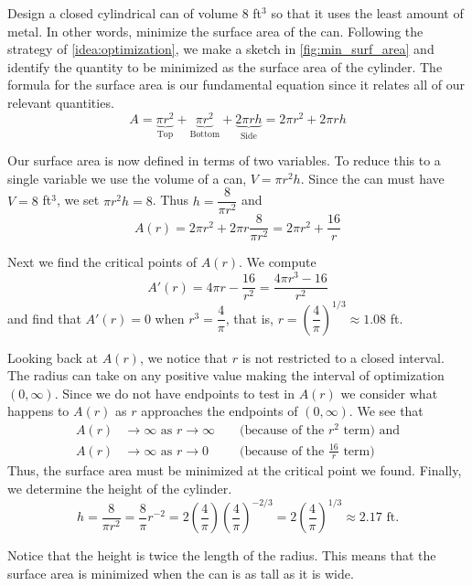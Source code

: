 \begin{example}\label{ex_min_surf_area}
Design a closed cylindrical can of volume $8$ ft$^3$ so that it uses the least amount of metal. In other words, minimize the surface area of the can.
Following the strategy of \autoref{idea:optimization}, we make a sketch in \autoref{fig:min_surf_area} and identify the quantity to be minimized as the surface area of the cylinder. The formula for the surface area is our fundamental equation  since it relates all of our relevant quantities.
\[
 A
 =\underbrace{\pi r^2}_{\text{Top}}
 +\underbrace{\pi r^2}_{\text{Bottom}}
 +\underbrace{2\pi rh}_{\text{Side}}
 =2\pi r^2+2\pi rh
\]

Our surface area is now defined in terms of two variables. To reduce this to a single variable we use the volume of a can, $V=\pi r^2h$. Since the can must have $V=8$ ft$^3$, we set $\pi r^2h=8$. Thus $h=\dfrac8{\pi r^2}$ and
\[A(r)=2\pi r^2+2\pi r\frac8{\pi r^2}=2\pi r^2+\frac{16}{r}\]

Next we find the critical points of $A(r)$. We compute
\[A'(r)=4\pi r-\dfrac{16}{r^2}=\dfrac{4\pi r^3-16}{r^2}\]
and find that $A'(r)=0$ when $r^3=\dfrac4\pi$, that is, $r=\left(\dfrac4\pi\right)^{1/3}\approx 1.08$ ft.

Looking back at $A(r)$, we notice that $r$ is not restricted to a closed interval. The radius can take on any positive value making the interval of optimization $(0, \infty)$. Since we do not have endpoints to test in $A(r)$ we consider what happens to $A(r)$ as $r$ approaches the endpoints of $(0, \infty)$. We see that
\begin{align*}
	A(r) &\to\infty\text{ as }r\to\infty&&\text{ (because of the $r^2$ term) and}\\
	A(r) &\to\infty\text{ as }r\to0&&\text{ (because of the $\frac{16}{r}$ term)}
\end{align*}
Thus, the surface area must be minimized at the critical point we found. Finally, we determine the height of the cylinder.
\[
 h
 =\frac8{\pi r^2}
 =\frac8\pi r^{-2}
 =2\left(\frac4\pi\right)\left(\frac4\pi\right)^{-2/3}
 =2\left(\frac4\pi\right)^{1/3}
 \approx 2.17\text{ ft.}
\]

Notice that the height is twice the length of the radius. This means that the surface area is minimized when the can is as tall as it is wide.
\end{example}

